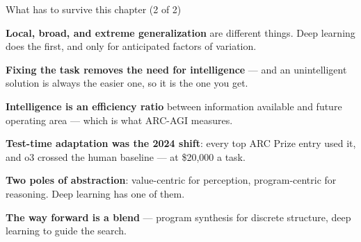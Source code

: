 \documentclass[aspectratio=169,11pt,t]{beamer}
\begin{document}
\begin{frame}[shrink=25]{What has to survive this chapter (2 of 2)}
\begin{isteps}
\item \textbf{Local, broad, and extreme generalization} are different things. Deep learning does the first, and only for anticipated factors of variation.
\item \textbf{Fixing the task removes the need for intelligence} --- and an unintelligent solution is always the easier one, so it is the one you get.
\item \textbf{Intelligence is an efficiency ratio} between information available and future operating area --- which is what ARC-AGI measures.
\item \textbf{Test-time adaptation was the 2024 shift}: every top ARC Prize entry used it, and o3 crossed the human baseline --- at \$20,000 a task.
\item \textbf{Two poles of abstraction}: value-centric for perception, program-centric for reasoning. Deep learning has one of them.
\item \textbf{The way forward is a blend} --- program synthesis for discrete structure, deep learning to guide the search.
\end{isteps}
\vskip 4pt
\vskip 2pt
\end{frame}
\end{document}
